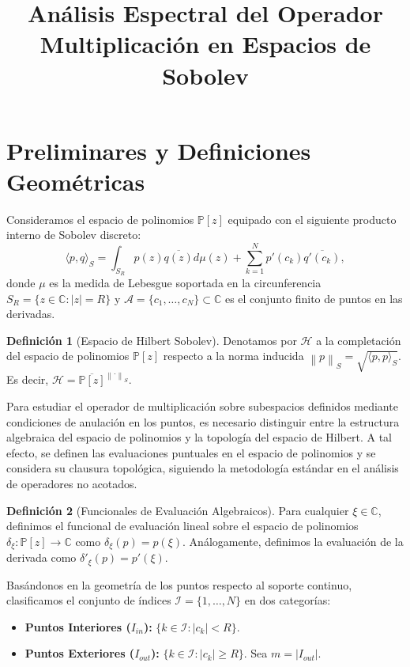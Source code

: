 \documentclass[12pt,a4paper]{article}
\title{Análisis Espectral del Operador Multiplicación en Espacios de Sobolev}
\author{}
\date{}
\theoremstyle{definition}
\newtheorem{definicion}{Definición}
\theoremstyle{remark}
\newcommand{\C}{\mathbb{C}}
\newcommand{\Poly}{\mathbb{P}[z]}
\newcommand{\norm}[1]{\left\| #1 \right\|_S}
\newcommand{\abs}[1]{\left| #1 \right|}
\newcommand{\ip}[2]{\langle #1, #2 \rangle_S}
\begin{document}
\maketitle

\section{Preliminares y Definiciones Geométricas}

Consideramos el espacio de polinomios $\Poly$ equipado con el siguiente producto interno de Sobolev discreto:
\begin{equation}
    \ip{p}{q} = \int_{S_R} p(z)\overline{q(z)} d\mu(z) + \sum_{k=1}^{N} p'(c_k)\overline{q'(c_k)},
\end{equation}
donde $\mu$ es la medida de Lebesgue soportada en la circunferencia $S_R = \{z \in \C : \abs{z} = R\}$ y $\mathcal{A} = \{c_1, \dots, c_N\} \subset \C$ es el conjunto finito de puntos en las derivadas.

\begin{definicion}[Espacio de Hilbert Sobolev]
    Denotamos por $\mathcal{H}$ a la completación del espacio de polinomios $\Poly$ respecto a la norma inducida $\norm{p} = \sqrt{\ip{p}{p}}$. Es decir, $\mathcal{H} = \overline{\Poly}^{\norm{\cdot}}$.
\end{definicion}

Para estudiar el operador de multiplicación sobre subespacios definidos mediante condiciones de anulación en los puntos, es necesario distinguir entre la estructura algebraica del espacio de polinomios y la topología del espacio de Hilbert. A tal efecto, se definen las evaluaciones puntuales en el espacio de polinomios y se considera su clausura topológica, siguiendo la metodología estándar en el análisis de operadores no acotados.

\begin{definicion}[Funcionales de Evaluación Algebraicos]
    Para cualquier $\xi \in \C$, definimos el funcional de evaluación lineal sobre el espacio de polinomios $\delta_\xi : \Poly \to \C$ como $\delta_\xi(p) = p(\xi)$. Análogamente, definimos la evaluación de la derivada como $\delta'_\xi(p) = p'(\xi)$.
\end{definicion}

Basándonos en la geometría de los puntos respecto al soporte continuo, clasificamos el conjunto de índices $\mathcal{I} = \{1, \dots, N\}$ en dos categorías:
\begin{itemize}
    \item \textbf{Puntos Interiores ($I_{in}$):} $\{k \in \mathcal{I} : \abs{c_k} < R\}$.
    \item \textbf{Puntos Exteriores ($I_{out}$):} $\{k \in \mathcal{I} : \abs{c_k} \geq R\}$. Sea $m = |I_{out}|$.
\end{itemize}
\end{document}
